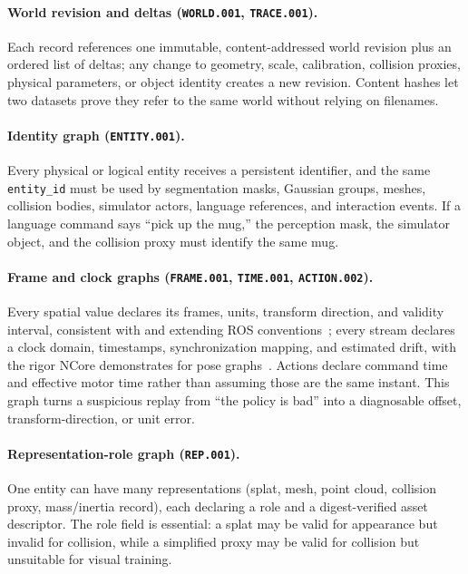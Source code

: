 \paragraph{World revision and deltas (\texttt{WORLD.001}, \texttt{TRACE.001}).}
Each record references one immutable, content-addressed world revision plus an ordered list of
deltas; any change to geometry, scale, calibration, collision proxies, physical parameters, or
object identity creates a new revision. Content hashes let two datasets prove they refer to the
same world without relying on filenames.

\paragraph{Identity graph (\texttt{ENTITY.001}).}
Every physical or logical entity receives a persistent identifier, and the same
\texttt{entity\_id} must be used by segmentation masks, Gaussian groups, meshes, collision bodies,
simulator actors, language references, and interaction events. If a language command says ``pick up
the mug,'' the perception mask, the simulator object, and the collision proxy must identify the
same mug.

\paragraph{Frame and clock graphs (\texttt{FRAME.001}, \texttt{TIME.001}, \texttt{ACTION.002}).}
Every spatial value declares its frames, units, transform direction, and validity interval,
consistent with and extending ROS conventions~\citep{rosrep103}; every stream declares a clock
domain, timestamps, synchronization mapping, and estimated drift, with the rigor NCore demonstrates
for pose graphs~\citep{ncore}. Actions declare command time and effective motor time rather than
assuming those are the same instant. This graph turns a suspicious replay from ``the policy is
bad'' into a diagnosable offset, transform-direction, or unit error.

\paragraph{Representation-role graph (\texttt{REP.001}).}
One entity can have many representations (splat, mesh, point cloud, collision proxy, mass/inertia
record), each declaring a role and a digest-verified asset descriptor. The role field is essential:
a splat may be valid for appearance but invalid for collision, while a simplified proxy may be
valid for collision but unsuitable for visual training.

